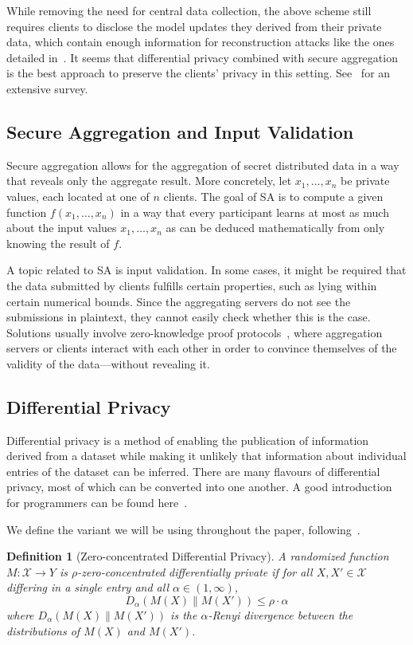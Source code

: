 \documentclass{article}
\newtheorem{definition}{Definition}
\begin{document}
While removing the need for central data collection, the above scheme still
requires clients to disclose the model updates they derived from their private
data, which contain enough information for reconstruction attacks like the ones
detailed in~\cite{7958568,Boenisch2021WhenTC}. It seems that differential
privacy combined with secure aggregation is the best approach to
preserve the clients' privacy in this setting. See~\cite{fl-survey} for an extensive survey.

\subsection{Secure Aggregation and Input Validation}
Secure aggregation allows for the aggregation of secret distributed data in a
way that reveals only the aggregate result. More concretely, let
$x_1,\ldots,x_n$ be private values, each located at one of $n$ clients. The goal of SA
is to compute a given function $f(x_1,\ldots,x_n)$ in a way that every
participant learns at most as much about the input values $x_1,\ldots,x_n$
as can be deduced mathematically from only knowing the result of $f$.~\cite{prio}

A topic related to SA is input validation. In some cases, it might be
required that the data submitted by clients fulfills certain properties, such as
lying within certain numerical bounds. Since the aggregating servers
do not see the submissions in plaintext, they cannot easily check whether this
is the case. Solutions usually involve zero-knowledge proof
protocols~\cite{BBCGGI19}, where aggregation servers or clients interact with each other in
order to convince themselves of the validity of the data---without revealing it.


\subsection{Differential Privacy}
Differential privacy is a method of enabling the publication of information derived from a dataset while making it unlikely that information about individual entries of the dataset can be inferred. There are many flavours of differential privacy, most of which can be converted into one another. A good introduction for programmers can be found here~\cite{near_abuah_2021}.

We define the variant we will be using throughout the paper, following~\cite{DBLP:journals/corr/BunS16}.
\begin{definition}[Zero-concentrated Differential Privacy]
  \label{def:zcdp}
A randomized function $M: \mathcal X\rightarrow Y$ is $\rho$-zero-concentrated differentially private if for all $X,X'\in \mathcal X$ differing in a single entry and all $\alpha\in(1,\infty)$,
$$D_\alpha(M(X)\|M(X'))\leq \rho\cdot\alpha$$
where $D_\alpha(M(X)\|M(X'))$ is the $\alpha$-Renyi divergence between the distributions of $M(X)$ and $M(X')$.
\end{definition}
\end{document}
